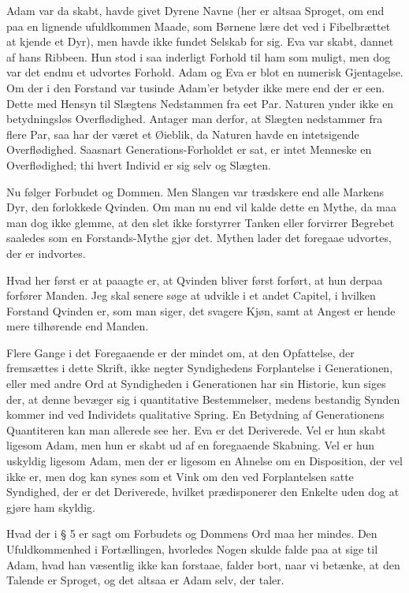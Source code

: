 \documentclass[12pt,a4paper]{article}
\begin{document}
Adam var da skabt, havde givet Dyrene Navne (her er altsaa Sproget, om end paa en lignende ufuldkommen Maade, som Børnene lære det ved i Fibelbrættet at kjende et Dyr), men havde ikke fundet Selskab for sig. Eva var skabt, dannet af hans Ribbeen. Hun stod i saa inderligt Forhold til ham som muligt, men dog var det endnu et udvortes Forhold. Adam og Eva er blot en numerisk Gjentagelse. Om der i den Forstand var tusinde Adam'er betyder ikke mere end der er een. Dette med Hensyn til Slægtens Nedstammen fra eet Par. Naturen ynder ikke en betydningsløs Overflødighed. Antager man derfor, at Slægten nedstammer fra flere Par, saa har der været et Øieblik, da Naturen havde en intetsigende Overflødighed. Saasnart Generations-Forholdet er sat, er intet Menneske en Overflødighed; thi hvert Individ er sig selv og Slægten.

Nu følger Forbudet og Dommen. Men Slangen var trædskere end alle Markens Dyr, den forlokkede Qvinden. Om man nu end vil kalde dette en Mythe, da maa man dog ikke glemme, at den slet ikke forstyrrer Tanken eller forvirrer Begrebet saaledes som en Forstands-Mythe gjør det. Mythen lader det foregaae udvortes, der er indvortes.

Hvad her først er at paaagte er, at Qvinden bliver først forført, at hun derpaa forfører Manden. Jeg skal senere søge at udvikle i et andet Capitel, i hvilken Forstand Qvinden er, som man siger, det svagere Kjøn, samt at Angest er hende mere tilhørende end Manden.

Flere Gange i det Foregaaende er der mindet om, at den Opfattelse, der fremsættes i dette Skrift, ikke negter Syndighedens Forplantelse i Generationen, eller med andre Ord at Syndigheden i Generationen har sin Historie, kun siges der, at denne bevæger sig i quantitative Bestemmelser, medens bestandig Synden kommer ind ved Individets qualitative Spring. En Betydning af Generationens Quantiteren kan man allerede see her. Eva er det Deriverede. Vel er hun skabt ligesom Adam, men hun er skabt ud af en foregaaende Skabning. Vel er hun uskyldig ligesom Adam, men der er ligesom en Ahnelse om en Disposition, der vel ikke er, men dog kan synes som et Vink om den ved Forplantelsen satte Syndighed, der er det Deriverede, hvilket prædisponerer den Enkelte uden dog at gjøre ham skyldig.

Hvad der i § 5 er sagt om Forbudets og Dommens Ord maa her mindes. Den Ufuldkommenhed i Fortællingen, hvorledes Nogen skulde falde paa at sige til Adam, hvad han væsentlig ikke kan forstaae, falder bort, naar vi betænke, at den Talende er Sproget, og det altsaa er Adam selv, der taler.
\end{document}
